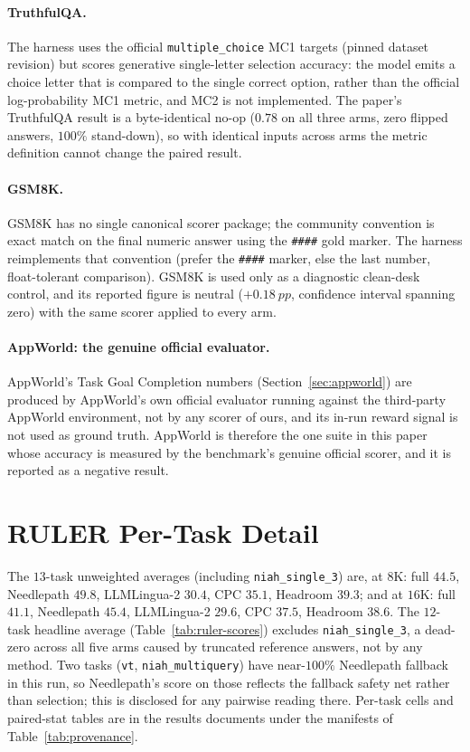 \documentclass[11pt]{article}
\newcommand{\pp}{~pp}          %
\newcommand{\NP}{Needlepath}
\begin{document}
\paragraph{TruthfulQA.} The harness uses the official \texttt{multiple\_choice} MC1 targets (pinned
dataset revision) but scores generative single-letter selection accuracy: the model emits a choice
letter that is compared to the single correct option, rather than the official log-probability MC1
metric, and MC2 is not implemented. The paper's TruthfulQA result is a byte-identical no-op ($0.78$
on all three arms, zero flipped answers, $100\%$ stand-down), so with identical inputs across arms
the metric definition cannot change the paired result.

\paragraph{GSM8K.} GSM8K has no single canonical scorer package; the community convention is exact
match on the final numeric answer using the \texttt{\#\#\#\#} gold marker. The harness reimplements
that convention (prefer the \texttt{\#\#\#\#} marker, else the last number, float-tolerant
comparison). GSM8K is used only as a diagnostic clean-desk control, and its reported figure is
neutral ($+0.18\pp$, confidence interval spanning zero) with the same scorer applied to every arm.

\paragraph{AppWorld: the genuine official evaluator.} AppWorld's Task Goal Completion numbers
(Section~\ref{sec:appworld}) are produced by AppWorld's own official evaluator running against the
third-party AppWorld environment, not by any scorer of ours, and its in-run reward signal is not
used as ground truth. AppWorld is therefore the one suite in this paper whose accuracy is measured
by the benchmark's genuine official scorer, and it is reported as a negative result.

\section{RULER Per-Task Detail}
\label{app:ruler}

The $13$-task unweighted averages (including \texttt{niah\_single\_3}) are, at $8$K: full $44.5$,
\NP{} $49.8$, LLMLingua-2 $30.4$, CPC $35.1$, Headroom $39.3$; and at $16$K: full $41.1$, \NP{}
$45.4$, LLMLingua-2 $29.6$, CPC $37.5$, Headroom $38.6$. The $12$-task headline average
(Table~\ref{tab:ruler-scores}) excludes \texttt{niah\_single\_3}, a dead-zero across all five arms
caused by truncated reference answers, not by any method. Two tasks (\texttt{vt},
\texttt{niah\_multiquery}) have near-$100\%$ \NP{} fallback in this run, so \NP{}'s score on those
reflects the fallback safety net rather than selection; this is disclosed for any pairwise reading
there. Per-task cells and paired-stat tables are in the results documents under the manifests of
Table~\ref{tab:provenance}.
\end{document}
